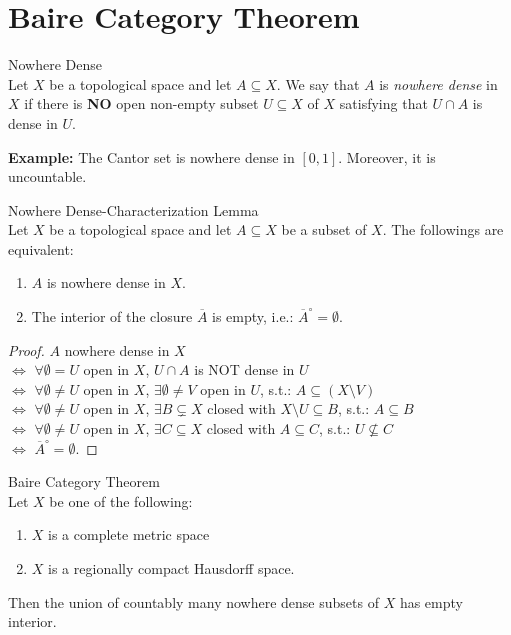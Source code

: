 \section{Baire Category Theorem}

\begin{definition}{Nowhere Dense}\\
Let $X$ be a topological space and let $A \subseteq X$. We say that $A$ is \textit{nowhere dense} in $X$ if there is \textbf{NO} open non-empty subset $U \subseteq X$ of $X$ satisfying that $U \cap A$ is dense in $U$.
\end{definition}

\noindent\textbf{Example:} The Cantor set is nowhere dense in $[0,1]$. Moreover, it is uncountable.

\begin{lemma}{Nowhere Dense-Characterization Lemma}\\
Let $X$ be a topological space and let $A \subseteq X$ be a subset of $X$. The followings are equivalent:
\begin{enumerate}
    \item $A$ is nowhere dense in $X$.
    \item The interior of the closure $\overline{A}$ is empty, i.e.: $\overline{A}^\circ =\emptyset$.
\end{enumerate}
\end{lemma}

\begin{proof}
    $A$ nowhere dense in $X$ \\
    $\Leftrightarrow$ $\forall \emptyset = U$ open in $X$, $U \cap A$ is NOT dense in $U$\\
    $\Leftrightarrow$ $\forall \emptyset \neq U$ open in $X$, $\exists \emptyset \neq V$ open in $U$, s.t.: $A \subseteq (X \setminus V)$\\
    $\Leftrightarrow$ $\forall \emptyset \neq U$ open in $X$, $\exists B \subsetneq X$ closed with $X \setminus U \subseteq B$, s.t.: $A \subseteq B$\\
    $\Leftrightarrow$ $\forall \emptyset \neq U$ open in $X$, $\exists C \subseteq X$ closed with $A \subseteq C$, s.t.: $U \not \subseteq C$\\
    $\Leftrightarrow$ $\overline{A}^\circ =\emptyset$.
\end{proof}

\begin{theorem}{Baire Category Theorem}\\
Let $X$ be one of the following:
\begin{enumerate}
    \item $X$ is a complete metric space
    \item $X$ is a regionally compact Hausdorff space.
\end{enumerate}
Then the union of countably many nowhere dense subsets of $X$ has empty interior.
\end{theorem}

